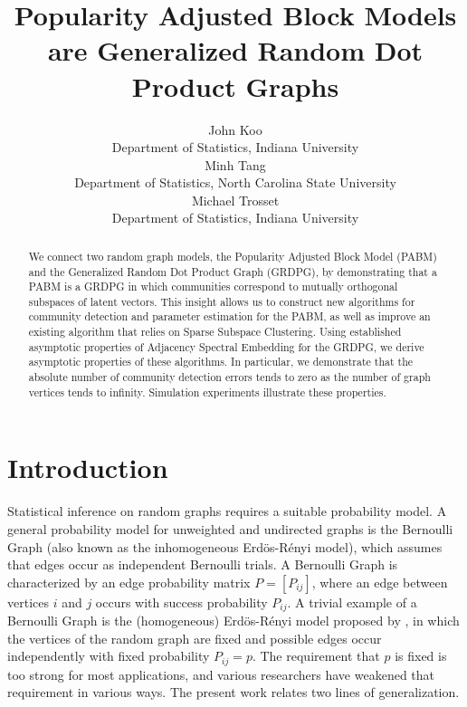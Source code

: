 \documentclass[12pt]{article}
\title{Popularity Adjusted Block Models are Generalized Random Dot Product Graphs}
\author{John Koo\\Department of Statistics, Indiana University\\
Minh Tang\\Department of Statistics, North Carolina State University\\
Michael Trosset\\Department of Statistics, Indiana University}
\date{}
\def\spacingset#1{\renewcommand{\baselinestretch}%
{#1}\small\normalsize} \spacingset{1}
\providecommand{\tightlist}{%
  \setlength{\itemsep}{0pt}\setlength{\parskip}{0pt}}
\begin{document}
\maketitle

\begin{abstract}
We connect two random graph models, the Popularity Adjusted Block Model
(PABM) and the Generalized Random Dot Product Graph (GRDPG),
by demonstrating that a PABM is a GRDPG in which communities correspond to 
mutually orthogonal subspaces of latent vectors. 
This insight allows us to construct new algorithms for community detection
and parameter estimation for the PABM, 
as well as improve an existing algorithm 
that relies on Sparse Subspace Clustering. 
Using established asymptotic properties of 
Adjacency Spectral Embedding for the GRDPG, 
we derive asymptotic properties of these algorithms. 
In particular, we demonstrate that the absolute number of 
community detection errors tends to zero as 
the number of graph vertices tends to infinity. 
Simulation experiments illustrate these properties. 
\end{abstract}

\providecommand{\tightlist}{%
  \setlength{\itemsep}{0pt}\setlength{\parskip}{0pt}}
\newcommand{\diag}{\mathrm{diag}}
\newcommand{\tr}{\mathrm{Tr}}
\newcommand{\blockdiag}{\mathrm{blockdiag}}
\newcommand{\indep}{\stackrel{\mathrm{ind}}{\sim}}
\newcommand{\iid}{\stackrel{\mathrm{iid}}{\sim}}
\newcommand{\Bernoulli}{\mathrm{Bernoulli}}
\newcommand{\Betadist}{\mathrm{Beta}}
\newcommand{\BG}{\mathrm{BernoulliGraph}}
\newcommand{\PABM}{\mathrm{PABM}}
\newcommand{\RDPG}{\mathrm{RDPG}}
\newcommand{\GRDPG}{\mathrm{GRDPG}}
\newcommand{\Multinomial}{\mathrm{Multinomial}}
\newtheorem{theorem}{Theorem}
\newtheorem{lemma}{Lemma}
\newtheorem{proposition}{Proposition}
\theoremstyle{remark}
\newtheorem*{remark}{Remark}
\theoremstyle{definition}
\newtheorem{definition}{Definition}
\newtheorem{example}{Example}
\newpage
\spacingset{1.5} %

\hypertarget{introduction}{%
\section{Introduction}\label{introduction}}

Statistical inference on random graphs requires a suitable probability model. 
A general probability model for unweighted and undirected graphs is the Bernoulli Graph (also known as the inhomogeneous Erd\"{o}s-R\'{e}nyi model), which assumes that edges occur as independent Bernoulli trials.  A Bernoulli Graph is characterized by an edge probability matrix $P=[P_{ij}]$, where an edge between vertices $i$ and $j$ occurs with success probability $P_{ij}$.  A trivial example of a Bernoulli Graph is the (homogeneous) Erd\"{o}s-R\'{e}nyi model proposed by \citet{Gilbert:1959}, in which the vertices of the random graph are fixed and possible edges occur independently with fixed probability $P_{ij}=p$.  The requirement that $p$ is fixed is too strong for most applications, and various researchers have weakened that requirement in various ways.  The present work relates two lines of generalization.
\end{document}
